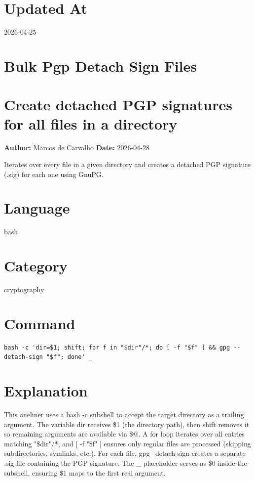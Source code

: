 \documentclass[openany]{book}
\begin{document}
\section*{Updated At}
2026-04-25

\section{Bulk Pgp Detach Sign Files}
\section*{Create detached PGP signatures for all files in a directory}
\textbf{Author:} Marcos de Carvalho \hfill \textbf{Date:} 2026-04-28

\noindent Iterates over every file in a given directory and creates a detached PGP signature (.sig) for each one using GnuPG.

\section*{Language}
bash

\section*{Category}
cryptography

\section*{Command}
\begin{lstlisting}
bash -c 'dir=$1; shift; for f in "$dir"/*; do [ -f "$f" ] && gpg --detach-sign "$f"; done' _
\end{lstlisting}

\section*{Explanation}
This oneliner uses a bash -c subshell to accept the target directory as a trailing argument. The variable dir receives \$1 (the directory path), then shift removes it so remaining arguments are available via \$@. A for loop iterates over all entries matching "\$dir"/*, and [ -f "\$f" ] ensures only regular files are processed (skipping subdirectories, symlinks, etc.). For each file, gpg --detach-sign creates a separate .sig file containing the PGP signature. The \_ placeholder serves as \$0 inside the subshell, ensuring \$1 maps to the first real argument.
\end{document}
